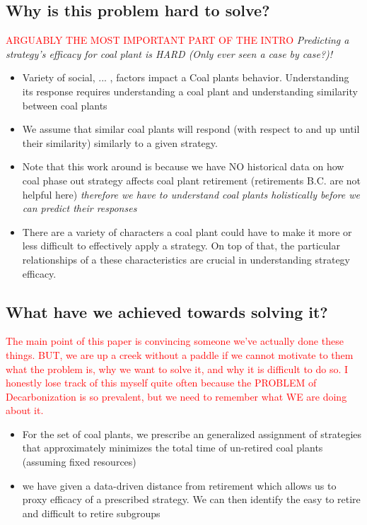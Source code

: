 \subsection{Why is this problem hard to solve?}
\textcolor{red}{ARGUABLY THE MOST IMPORTANT PART OF THE INTRO}
 \textit{Predicting a strategy's efficacy for coal plant is HARD (Only ever seen a case by case?)! }
\begin{itemize}
    \item Variety of social, ... , factors impact a Coal plants behavior. Understanding its response requires understanding a coal plant and understanding similarity between coal plants
    \item We assume that similar coal plants will respond (with respect to and up until their similarity) similarly to a given strategy. \item Note that this work around is because we have NO historical data on how coal phase out strategy affects coal plant retirement (retirements B.C. are not helpful here) \textit{therefore we have to understand coal plants holistically before we can predict their responses}
    \item There are a variety of characters a coal plant could have to make it more or less difficult to effectively apply a strategy. On top of that, the particular relationships of a these characteristics are crucial in understanding strategy efficacy. 
\end{itemize}


\subsection{What have we achieved towards solving it?}
\textcolor{red}{The main point of this paper is convincing someone we've actually done these things. BUT, we are up a creek without a paddle if we cannot motivate to them what the problem is, why we want to solve it, and why it is difficult to do so. I honestly lose track of this myself quite often because the PROBLEM of Decarbonization is so prevalent, but we need to remember what WE are doing about it.}
\begin{itemize}
    \item For the set of coal plants, we prescribe an generalized assignment of strategies that approximately minimizes the total time of un-retired coal plants (assuming fixed resources)
    \item we have given a data-driven distance from retirement which allows us to proxy efficacy of a prescribed strategy. We can then identify the easy to retire and difficult to retire subgroups 
\end{itemize}

